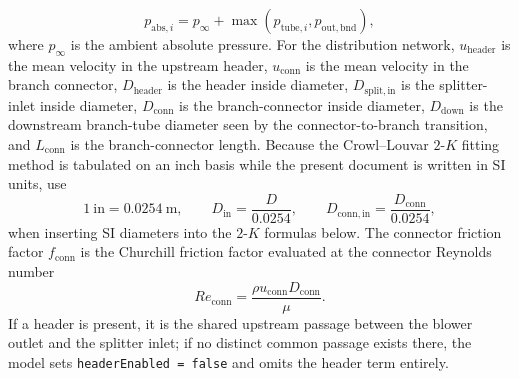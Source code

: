 \documentclass[11pt]{article}
\newcommand{\code}[1]{\nolinkurl{#1}}
\begin{document}
\begin{equation}
\label{eq:branch_absolute_pressure}
p_{\mathrm{abs},i}=p_\infty+\max\!\left(p_{\mathrm{tube},i},p_{\mathrm{out,bnd}}\right),
\end{equation}
where \(p_\infty\) is the ambient absolute pressure. For the distribution network, \(u_{\mathrm{header}}\) is the mean velocity in the upstream header, \(u_{\mathrm{conn}}\) is the mean velocity in the branch connector, \(D_{\mathrm{header}}\) is the header inside diameter, \(D_{\mathrm{split,in}}\) is the splitter-inlet inside diameter, \(D_{\mathrm{conn}}\) is the branch-connector inside diameter, \(D_{\mathrm{down}}\) is the downstream branch-tube diameter seen by the connector-to-branch transition, and \(L_{\mathrm{conn}}\) is the branch-connector length. Because the Crowl--Louvar \(2\)-\(K\) fitting method is tabulated on an inch basis while the present document is written in SI units, use
\[
1\ \mathrm{in}=0.0254\ \mathrm{m},
\qquad
D_{\mathrm{in}}=\frac{D}{0.0254},
\qquad
D_{\mathrm{conn,in}}=\frac{D_{\mathrm{conn}}}{0.0254},
\]
when inserting SI diameters into the \(2\)-\(K\) formulas below. The connector friction factor \(f_{\mathrm{conn}}\) is the Churchill friction factor evaluated at the connector Reynolds number
\[
Re_{\mathrm{conn}}=\frac{\rho u_{\mathrm{conn}}D_{\mathrm{conn}}}{\mu}.
\]
If a header is present, it is the shared upstream passage between the blower outlet and the splitter inlet; if no distinct common passage exists there, the model sets \code{headerEnabled = false} and omits the header term entirely.
\end{document}
